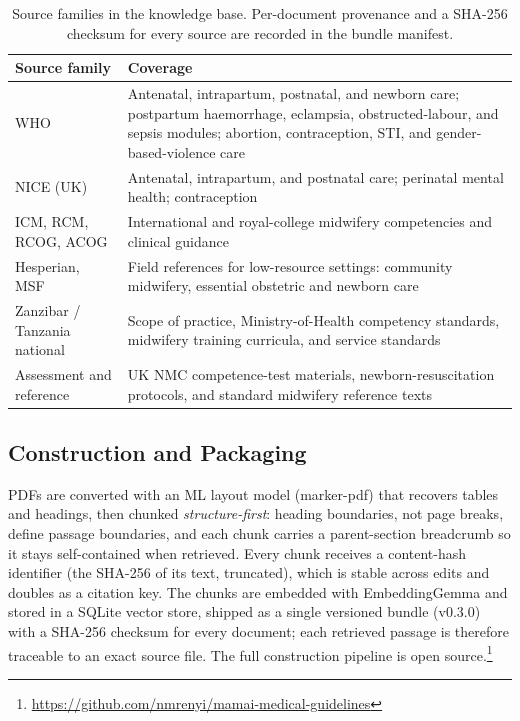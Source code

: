 \begin{table}[t]
\caption{Source families in the knowledge base. Per-document provenance and a
SHA-256 checksum for every source are recorded in the bundle manifest.}
\label{tab:sources}
\small
\begin{tabular}{@{}p{}p{}@{}}
\toprule
\textbf{Source family} & \textbf{Coverage} \\
\midrule
WHO & Antenatal, intrapartum, postnatal, and newborn care; postpartum
haemorrhage, eclampsia, obstructed-labour, and sepsis modules; abortion,
contraception, STI, and gender-based-violence care \\[2pt]
NICE (UK) & Antenatal, intrapartum, and postnatal care; perinatal mental
health; contraception \\[2pt]
ICM, RCM, RCOG, ACOG & International and royal-college midwifery competencies
and clinical guidance \\[2pt]
Hesperian, MSF & Field references for low-resource settings: community
midwifery, essential obstetric and newborn care \\[2pt]
Zanzibar / Tanzania national & Scope of practice, Ministry-of-Health
competency standards, midwifery training curricula, and service standards \\[2pt]
Assessment and reference & UK NMC competence-test materials,
newborn-resuscitation protocols, and standard midwifery reference texts \\
\bottomrule
\end{tabular}
\end{table}

\subsection{Construction and Packaging}

PDFs are converted with an ML layout model (marker-pdf) that recovers tables
and headings, then chunked \emph{structure-first}: heading boundaries, not
page breaks, define passage boundaries, and each chunk carries a
parent-section breadcrumb so it stays self-contained when retrieved. Every
chunk receives a content-hash identifier (the SHA-256 of its text,
truncated), which is stable across edits and doubles as a citation key. The
chunks are embedded with EmbeddingGemma and stored in a SQLite vector store,
shipped as a single versioned bundle (v0.3.0) with a SHA-256 checksum for
every document; each retrieved passage is therefore traceable to an exact
source file. The full construction pipeline is open
source.\footnote{\url{https://github.com/nmrenyi/mamai-medical-guidelines}}

